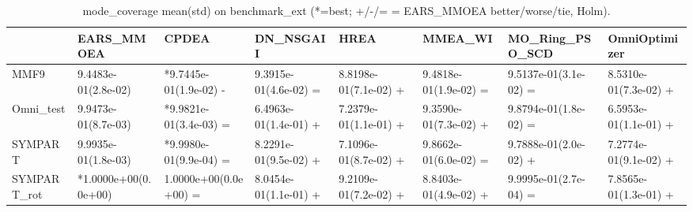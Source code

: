 \begin{table}[t]
\centering
\caption{mode_coverage mean(std) on benchmark_ext (*=best; +/-/= = EARS_MMOEA better/worse/tie, Holm).}
\label{tab:benchmark_ext_mode_coverage}
\begin{tabular}{llllllll}
\toprule
 & EARS\_MMOEA & CPDEA & DN\_NSGAII & HREA & MMEA\_WI & MO\_Ring\_PSO\_SCD & OmniOptimizer \\
\midrule
MMF9 & 9.4483e-01(2.8e-02) & *9.7445e-01(1.9e-02) - & 9.3915e-01(4.6e-02) = & 8.8198e-01(7.1e-02) + & 9.4818e-01(1.9e-02) = & 9.5137e-01(3.1e-02) = & 8.5310e-01(7.3e-02) + \\
Omni\_test & 9.9473e-01(8.7e-03) & *9.9821e-01(3.4e-03) = & 6.4963e-01(1.4e-01) + & 7.2379e-01(1.1e-01) + & 9.3590e-01(7.3e-02) + & 9.8794e-01(1.8e-02) = & 6.5953e-01(1.1e-01) + \\
SYMPART & 9.9935e-01(1.8e-03) & *9.9980e-01(9.9e-04) = & 8.2291e-01(9.5e-02) + & 7.1096e-01(8.7e-02) + & 9.8662e-01(6.0e-02) = & 9.7888e-01(2.0e-02) + & 7.2774e-01(9.1e-02) + \\
SYMPART\_rot & *1.0000e+00(0.0e+00) & 1.0000e+00(0.0e+00) = & 8.0454e-01(1.1e-01) + & 9.2109e-01(7.2e-02) + & 8.8403e-01(4.9e-02) + & 9.9995e-01(2.7e-04) = & 7.8565e-01(1.3e-01) + \\
\bottomrule
\end{tabular}
\end{table}

